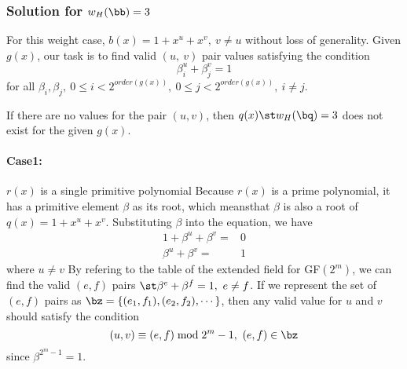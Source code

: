 

\newpage


\subsubsection{Solution for $w_H(\bb) =3$}
For this weight case, $b(x)=1+x^u+x^v,~v\neq u$ without loss of generality. Given $g(x)$, our task is to find valid $(u,~v)$ pair values satisfying the condition 
$$ \beta_i^u+\beta_j^v=1$$
for all $\beta_i,\beta_j,~0 \leq i <2^{order(g(x))},~0 \leq j <2^{order(g(x))},~i\neq j$.

 If there are no values for the pair $(u,v)$, then $q(x) \st w_H(\bq) =3$ does not exist for the given $g(x)$.
\paragraph{ Case1:} $r(x)$ is a single primitive polynomial \newline
Because $r(x)$ is a prime polynomial, it has a primitive element $\beta$ as its root, which means\newline that $\beta$ is also a root of $q(x)=1+x^u+x^v$. Substituting $\beta$ into the equation, we have 
\begin{equation}
\begin{split}
1+\beta^u+\beta^v=&0\\
\beta^u+\beta^v=&1
\end{split}
\end{equation}
where $u\neq v$
By refering to the table of the extended field for GF$(2^m)$, we can find the valid $(e,f)$ pairs $\st \beta^e+\beta^f=1,~e\neq f$.  If we represent the set of $(e,f)$ pairs as 
$\bz=\{ (e_1,f_1) ,( e_2,f_2),\cdots\} $, then any valid value for $u$ and $v$ should satisfy the condition
$$(u,v) \equiv (e,f) \bmod 2^m-1,~(e,f)\in \bz$$ since $\beta^{2^{m}-1}=1$.

